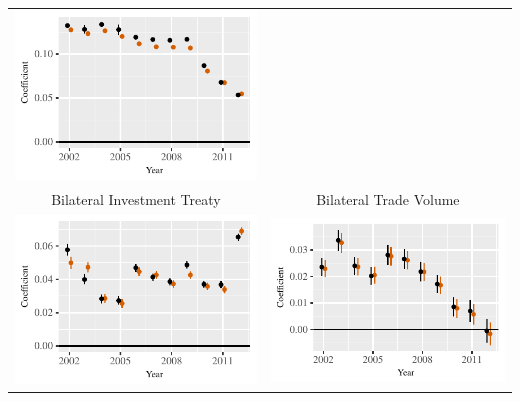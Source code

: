 \documentclass[reqno,onecolumn,letterpaper,12pt]{article}
\begin{document}
\begin{longtable}[!h]{c@{\hskip -.4cm}c}
\includegraphics[height=.2\textheight, clip=true, trim=.5cm .5cm 0cm .1cm]{draft_figures/rl_plots/GDPpc_out.pdf}   \\
Bilateral Investment Treaty &
Bilateral Trade Volume\\
\includegraphics[height=.2\textheight, clip=true, trim=0cm .5cm 0cm .1cm]{draft_figures/rl_plots/BIT.pdf}    &
\includegraphics[height=.2\textheight, clip=true, trim=.5cm .5cm 0cm .1cm]{draft_figures/rl_plots/TradeV.pdf}   \\

\end{longtable}
\end{document}
